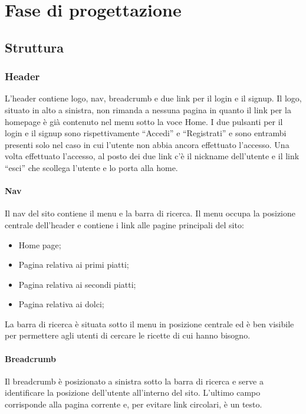 \section{Fase di progettazione}
\label{sec:fase_di_progettazione}
\subsection{Struttura}
\label{sub:struttura}
\subsubsection{Header}
\label{ssub:header}
L'header contiene logo, nav, breadcrumb e due link per il login e il signup. Il logo, situato in alto a sinistra, non rimanda a nessuna pagina in quanto il link per la homepage è già contenuto nel menu sotto la voce Home. I due pulsanti per il login e il signup sono rispettivamente ``Accedi'' e ``Registrati'' e sono entrambi presenti solo nel caso in cui l'utente non abbia ancora effettuato l'accesso. Una volta effettuato l'accesso, al posto dei due link c'è il nickname dell'utente e il link ``esci'' che scollega l'utente e lo porta alla home.
\paragraph{Nav}
\label{par:nav}
Il nav del sito contiene il menu e la barra di ricerca.
Il menu occupa la posizione centrale dell'header e contiene i link alle pagine principali del sito:
\begin{itemize}
	\item Home page;
	\item Pagina relativa ai primi piatti;
	\item Pagina relativa ai secondi piatti;
	\item Pagina relativa ai dolci;
\end{itemize}
La barra di ricerca è situata sotto il menu in posizione centrale ed è ben visibile per permettere agli utenti di cercare le ricette di cui hanno bisogno.
\paragraph{Breadcrumb}
\label{par:breadcrumb}
Il breadcrumb è posizionato a sinistra sotto la barra di ricerca e serve a identificare la posizione dell'utente all'interno del sito. L'ultimo campo corrisponde alla pagina corrente e, per evitare link circolari, è un testo.
